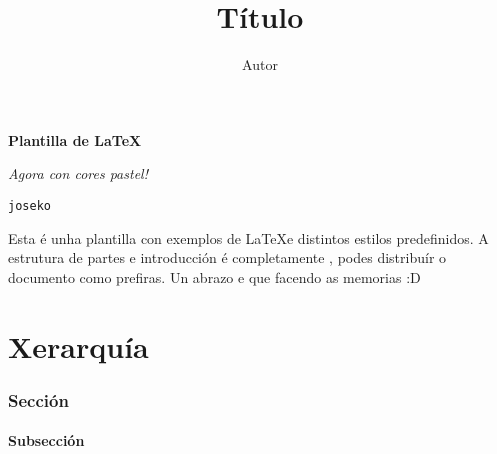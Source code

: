 \documentclass[12pt, titlepage]{article}
\title{\textbf {Título}}
\author{Autor}
\date{}
\begin{document}

    \begin{titlepage}
        \begin{center}
            \vspace*{3cm}
            \textbf{\LARGE Plantilla de \LaTeX}

            \vspace*{0.3cm}
            \textit{\large Agora con cores \textcolor{k_blue}{p}\textcolor{k_yellow}{a}\textcolor{k_green}{s}\textcolor{k_yellow}{t}\textcolor{k_blue}{e}\textcolor{k_green}{l}!}

            \vspace*{12cm}
            \texttt{\large \textcolor{k_green}{joseko}}

            \vspace*{1cm}
            Esta é unha plantilla con exemplos de \LaTeX e distintos estilos predefinidos. A estrutura de partes e introducción é completamente , podes distribuír o documento como prefiras. Un abrazo e que  facendo as memorias \textcolor{k_yellow}{:D}
        \end{center}
    \end{titlepage}

    { \setlength{\parskip}{0pt} %
      \tableofcontents }




    \newpage
    \part{Xerarquía}

    \section{Sección}

    \subsection{Subsección}
    
\end{document}
